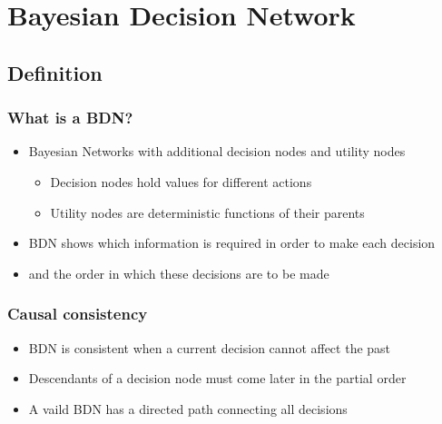 \section{Bayesian Decision Network}
\subsection{Definition}

\begin{frame}
\frametitle{What is a BDN?}
\begin{itemize}
\item Bayesian Networks with additional decision nodes and utility nodes
	\begin{itemize}
	\item Decision nodes hold values for different actions
	\item Utility nodes are deterministic functions of their parents
	\end{itemize}
\item BDN shows which information is required in order to make
each decision
\item and the order in which these decisions are to be made
\end{itemize}
\end{frame}

\begin{frame}
\frametitle{Causal consistency}
\begin{itemize}
\item BDN is consistent when a current decision cannot affect the past
\item Descendants of a decision node must come later in the partial order
\item A vaild BDN has a directed path connecting all decisions
\end{itemize}
\end{frame}


